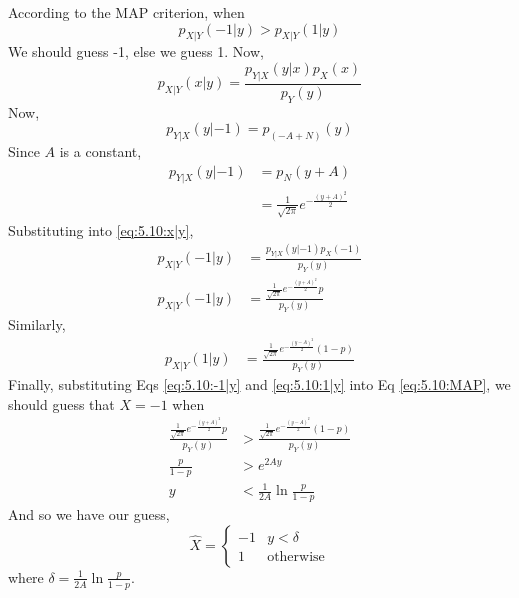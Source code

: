 \documentclass[journal, 12pt, twocolumn]{IEEEtran}
\begin{document}
\begin{enumerate}[label=\arabic{section}.\arabic*]
        According to the MAP criterion, when
        \begin{equation}
            p_{X|Y}(-1|y) > p_{X|Y}(1|y) \label{eq:5.10:MAP}
        \end{equation}
        We should guess -1, else we guess 1. Now,
        \begin{equation}
            p_{X|Y}(x|y) = \frac{p_{Y|X}(y|x)p_X(x)}{p_Y(y)} \label{eq:5.10:x|y}
        \end{equation}
        Now,
        \begin{equation}
            p_{Y|X}(y|-1) = p_{(-A+N)}(y)
        \end{equation}
        Since $A$ is a constant,
        \begin{align}
            p_{Y|X}(y|-1) &= p_{N}(y + A) \\
            &= \frac{1}{\sqrt{2 \pi}}e^{-\frac{(y + A)^2}{2}}
        \end{align}
        Substituting into \eqref{eq:5.10:x|y},
        \begin{align}
            p_{X|Y}(-1|y) &= \frac{p_{Y|X}(y|-1)p_X(-1)}{p_Y(y)} \\
            p_{X|Y}(-1|y) &= \frac{\frac{1}{\sqrt{2 \pi}} e^{-\frac{(y+A)^2}{2}} p}{p_Y(y)}
                \label{eq:5.10:-1|y}
        \end{align}
        Similarly,
        \begin{align}
            p_{X|Y}(1|y) &= \frac{\frac{1}{\sqrt{2 \pi}} e^{-\frac{(y-A)^2}{2}} (1-p)}{p_Y(y)}
                \label{eq:5.10:1|y}
        \end{align}
        Finally, substituting Eqs \eqref{eq:5.10:-1|y} and \eqref{eq:5.10:1|y} into Eq
        \eqref{eq:5.10:MAP}, we should guess that $X = -1$ when
        \begin{align}
            \frac{\frac{1}{\sqrt{2 \pi}} e^{-\frac{(y+A)^2}{2}} p}{p_Y(y)}
                &> \frac{\frac{1}{\sqrt{2 \pi}} e^{-\frac{(y-A)^2}{2}} (1-p)}{p_Y(y)} \\
            \frac{p}{1-p} &> e^{2 A y} \\
            y &< \frac{1}{2A} \ln \frac{p}{1-p}
        \end{align}
        And so we have our guess,
        \begin{equation}
            \hat{X} = \begin{cases}
                -1 & y < \delta \\
                1 & \text{otherwise}
            \end{cases}
        \end{equation}
        where $\delta = \frac{1}{2A} \ln \frac{p}{1-p}$.


\end{enumerate}
\end{document}
